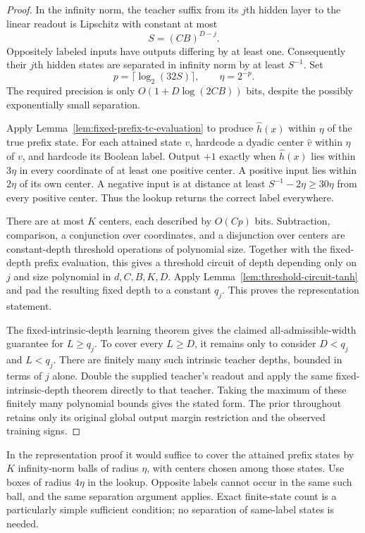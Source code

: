 \begin{proof}
In the infinity norm, the teacher suffix from its $j$th hidden layer
to the linear readout is Lipschitz with constant at most
\[
 S=(CB)^{D-j}.
\]
Oppositely labeled inputs have outputs differing by at least one.
Consequently their $j$th hidden states are separated in infinity norm
by at least $S^{-1}$. Set
\[
 p=\lceil\log_2(32S)\rceil,\qquad \eta=2^{-p}.
\]
The required precision is only $O(1+D\log(2CB))$ bits, despite the
possibly exponentially small separation.

Apply Lemma~\ref{lem:fixed-prefix-tc-evaluation} to produce
$\widehat h(x)$ within $\eta$ of the true prefix state. For each
attained state $v$, hardcode a dyadic center $\widehat v$ within
$\eta$ of $v$, and hardcode its Boolean label. Output $+1$ exactly
when $\widehat h(x)$ lies within $3\eta$ in every coordinate of at
least one positive center. A positive input lies within $2\eta$ of
its own center. A negative input is at distance at least
$S^{-1}-2\eta\ge30\eta$ from every positive center. Thus the
lookup returns the correct label everywhere.

There are at most $K$ centers, each described by $O(Cp)$ bits.
Subtraction, comparison, a conjunction over coordinates, and a
disjunction over centers are constant-depth threshold operations of
polynomial size. Together with the fixed-depth prefix evaluation,
this gives a threshold circuit of depth depending only on $j$ and
size polynomial in $d,C,B,K,D$. Apply
Lemma~\ref{lem:threshold-circuit-tanh} and pad the resulting fixed
depth to a constant $q_j$. This proves the representation statement.

The fixed-intrinsic-depth learning theorem gives the claimed
all-admissible-width guarantee for $L\ge q_j$. To cover every
$L\ge D$, it remains only to consider $D<q_j$ and $L<q_j$.
There are finitely many such intrinsic teacher depths, bounded in terms
of $j$ alone. Double the supplied teacher's readout and apply the same
fixed-intrinsic-depth theorem directly to that teacher. Taking the
maximum of these finitely many polynomial bounds gives the stated
form. The prior throughout retains only its original global output
margin restriction and the observed training signs.
\end{proof}

In the representation proof it would suffice to cover the attained
prefix states by $K$ infinity-norm balls of radius $\eta$, with centers
chosen among those states. Use boxes of radius $4\eta$ in the lookup.
Opposite labels cannot occur in the same such ball, and the same
separation argument applies. Exact finite-state count is a particularly
simple sufficient condition; no separation of same-label states is
needed.

